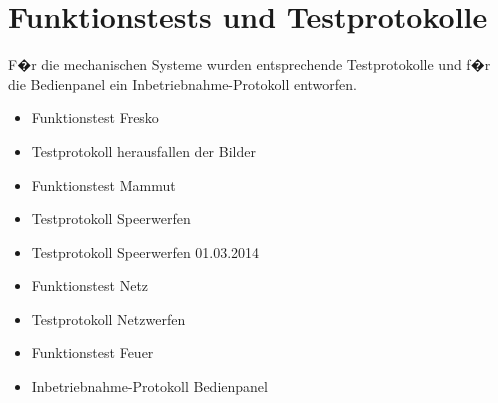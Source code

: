 %
%
\chapter{Funktionstests und Testprotokolle}\label{ch:funktionstests_testprotokolle_pa2}
	F�r die mechanischen Systeme wurden entsprechende Testprotokolle und f�r die Bedienpanel ein Inbetriebnahme-Protokoll entworfen.
	\begin{itemize}
		\item Funktionstest Fresko
		\item Testprotokoll herausfallen der Bilder
		\item Funktionstest Mammut
		\item Testprotokoll Speerwerfen	
		\item Testprotokoll Speerwerfen	01.03.2014	
		\item Funktionstest Netz
		\item Testprotokoll Netzwerfen
		\item Funktionstest Feuer
		\item Inbetriebnahme-Protokoll Bedienpanel
	\end{itemize}
	
	
	
	
	
	
	
	
	
